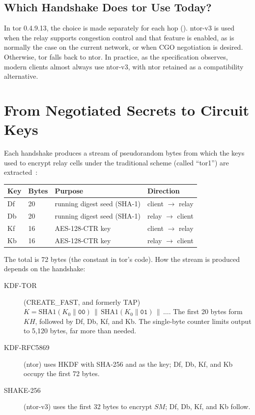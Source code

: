 \subsection{Which Handshake Does tor Use Today?}

In tor 0.4.9.13, the choice is made separately for each hop (). ntor-v3 is used when the relay supports congestion control and that feature is enabled, as is normally the case on the current network, or when CGO negotiation is desired. Otherwise, tor falls back to ntor. In practice, as the specification observes, modern clients almost always use ntor-v3, with ntor retained as a compatibility alternative.

\section{From Negotiated Secrets to Circuit Keys}\label{sec:circ-chiavi}

Each handshake produces a stream of pseudorandom bytes from which the keys used to encrypt relay cells under the traditional scheme (called \enquote{tor1}) are extracted~:

\begin{center}
\begin{tabular}{llll}
\toprule
Key & Bytes & Purpose & Direction \\
\midrule
Df & 20 & running digest seed (SHA-1) & client $\to$ relay \\
Db & 20 & running digest seed (SHA-1) & relay $\to$ client \\
Kf & 16 & AES-128-CTR key & client $\to$ relay \\
Kb & 16 & AES-128-CTR key & relay $\to$ client \\
\bottomrule
\end{tabular}
\end{center}

The total is 72 bytes (the  constant in tor's code). How the stream is produced depends on the handshake:
\begin{description}
  \item[KDF-TOR] (CREATE\_FAST, and formerly TAP) $K = \mathrm{SHA1}(K_0 \| \texttt{00}) \,\|\, \mathrm{SHA1}(K_0 \| \texttt{01}) \,\|\, \ldots$. The first 20 bytes form $KH$, followed by Df, Db, Kf, and Kb. The single-byte counter limits output to 5,120 bytes, far more than needed.
  \item[KDF-RFC5869] (ntor) uses HKDF with SHA-256 and  as the key; Df, Db, Kf, and Kb occupy the first 72 bytes.
  \item[SHAKE-256] (ntor-v3) uses the first 32 bytes to encrypt $SM$; Df, Db, Kf, and Kb follow.
\end{description}

